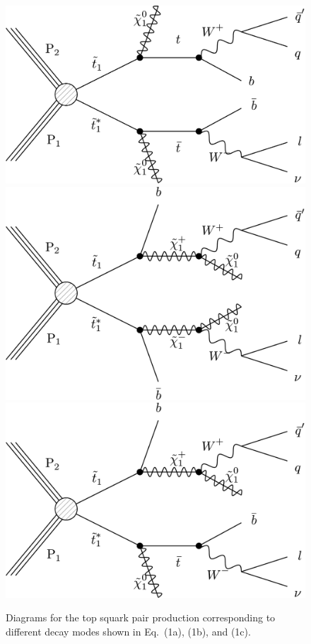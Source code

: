 \begin{figure}[!htpb]
\centering
\includegraphics[width=0.45\linewidth]{plots_stop/T2tt1l_feyn.pdf}
\includegraphics[width=0.45\linewidth]{plots_stop/T2bW1l_feyn.pdf}
\includegraphics[width=0.45\linewidth]{plots_stop/T2tb1l_feyn.pdf}
\label{sgnProc}
\caption{
  \label{fig:diagram}
        Diagrams for the top squark pair production corresponding to different decay modes shown in Eq.~(1a), (1b), and (1c).}
\end{figure}

